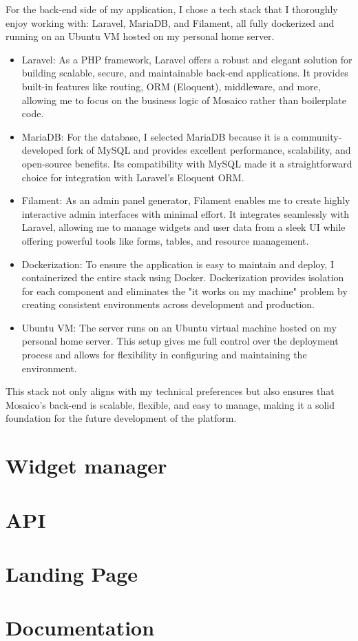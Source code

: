 For the back-end side of my application, I chose a tech stack that I thoroughly enjoy working with: Laravel, MariaDB, and Filament, all fully dockerized and running on an Ubuntu VM hosted on my personal home server.

\begin{itemize}
    \item Laravel: As a PHP framework, Laravel offers a robust and elegant solution for building scalable, secure, and maintainable back-end applications. It provides built-in features like routing, ORM (Eloquent), middleware, and more, allowing me to focus on the business logic of Mosaico rather than boilerplate code.
    \item MariaDB: For the database, I selected MariaDB because it is a community-developed fork of MySQL and provides excellent performance, scalability, and open-source benefits. Its compatibility with MySQL made it a straightforward choice for integration with Laravel's Eloquent ORM.
    \item Filament: As an admin panel generator, Filament enables me to create highly interactive admin interfaces with minimal effort. It integrates seamlessly with Laravel, allowing me to manage widgets and user data from a sleek UI while offering powerful tools like forms, tables, and resource management.
    \item Dockerization: To ensure the application is easy to maintain and deploy, I containerized the entire stack using Docker. Dockerization provides isolation for each component and eliminates the "it works on my machine" problem by creating consistent environments across development and production.
    \item Ubuntu VM: The server runs on an Ubuntu virtual machine hosted on my personal home server. This setup gives me full control over the deployment process and allows for flexibility in configuring and maintaining the environment.
\end{itemize}

This stack not only aligns with my technical preferences but also ensures that Mosaico's back-end is scalable, flexible, and easy to manage, making it a solid foundation for the future development of the platform.

\section{Widget manager}


\section{API}

\newpage
\section{Landing Page}

\newpage
\section{Documentation}
